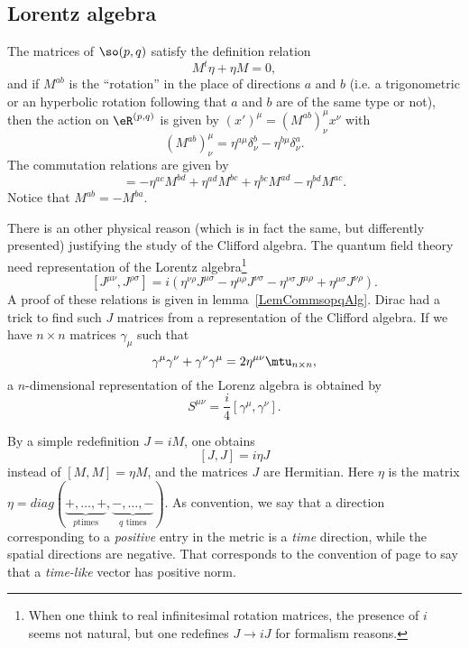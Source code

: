 \subsection{Lorentz algebra}

\begin{lemma}     \label{LemCommsopqAlg}
The matrices of $\so(p,q)$ satisfy the definition relation
\begin{equation}
    M^t\eta+\eta M=0,
\end{equation}
and if $M^{ab}$ is the ``rotation'' in the place of directions $a$ and $b$ (i.e. a trigonometric or an hyperbolic rotation following that $a$ and $b$ are of the same type or not), then the action on $\eR^{(p,q)}$ is given by $(x')^{\mu}=(M^{ab})^{\mu}_{\nu}x^{\nu}$ with
\begin{equation}
    (M^{ab})^{\mu}_{\nu}=\eta^{a\mu}\delta^b_{\nu}-\eta^{b\mu}\delta^a_{\nu}.
\end{equation}
The commutation relations are given by
\begin{equation}
    [M^{ab},M^{cd}]=-\eta^{ac}M^{bd}+\eta^{ad}M^{bc}+\eta^{bc}M^{ad}-\eta^{bd}M^{ac}.
\end{equation}
Notice that $M^{ab}=-M^{ba}$.
\end{lemma}

There is an other physical reason (which is in fact the same, but differently presented) justifying the study of the Clifford algebra. The quantum field theory need representation of the Lorentz algebra\footnote{When one think to real infinitesimal rotation matrices, the presence of $i$ seems not natural, but one redefines $J\to iJ$ for formalism reasons.}
\[
 [J^{\mu\nu},J^{\rho\sigma}]=i(\eta^{\nu\rho}J^{\mu\sigma}-\eta^{\mu\rho}J^{\nu\sigma}
 -\eta^{\nu\sigma}J^{\mu\rho}+\eta^{\mu\sigma}J^{\nu\rho}).
\]
A proof of these relations is given in lemma~\ref{LemCommsopqAlg}. Dirac had a trick to find such $J$ matrices from a representation of the Clifford algebra. If we have $n\times n$ matrices $\gamma_{\mu}$ such that
\[
    \gamma^{\mu}\gamma^{\nu}+\gamma^{\nu}\gamma^{\mu}=2\eta^{\mu\nu}\mtu_{n\times n},
\]
a $n$-dimensional representation of the Lorenz algebra is obtained by
\[
    S^{\mu\nu}=\frac{i}{4}\left[\gamma^{\mu},\gamma^{\nu}\right].
\]

By a simple redefinition $J=iM$, one obtains
\begin{equation}            \label{EqJJietaJcomm}
    [J,J]=i\eta J
\end{equation}
instead of $[M,M]=\eta M$, and the matrices $J$ are Hermitian. Here $\eta$ is the matrix $\eta=diag(\underbrace{+,\ldots,+}_{p \text{times}},\underbrace{-,\ldots,-}_{\text{$q$ times}})$. As convention, we say that a direction corresponding to a \emph{positive} entry in the metric is a \emph{time} direction, while the spatial directions are negative. That corresponds to the convention of page \pageref{PgDefsGenre} to say that a \emph{time-like} vector has positive norm.

